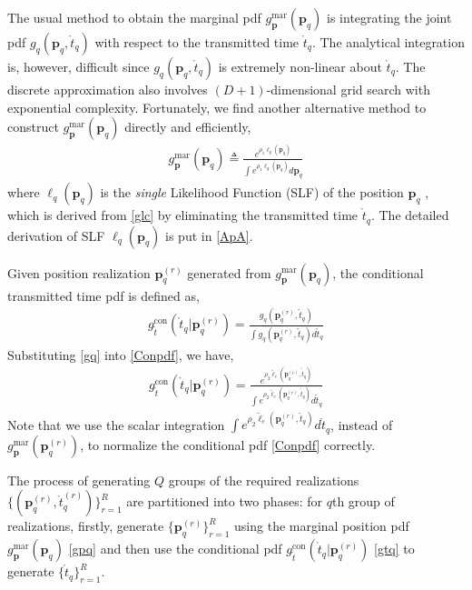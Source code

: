 \documentclass[review]{elsarticle}
\begin{document}
The usual method to obtain the marginal pdf $g_{\boldsymbol{p}}^{\text{mar}}(\boldsymbol{p}_q)$ is integrating the joint pdf $g_q(\boldsymbol{p}_q,\mathring{t}_q)$ with respect to the transmitted time $\mathring{t}_q$. The analytical integration is, however, difficult since $g_q(\boldsymbol{p}_q,\mathring{t}_q)$ is extremely non-linear about $\mathring{t}_q$. The discrete approximation also involves $(D+1)$-dimensional grid search with exponential complexity. Fortunately, we find another alternative method to construct $ g_{\boldsymbol{p}}^{\text{mar}}(\boldsymbol{p}_q)$ directly and efficiently,
\begin{align}\label{gmar}
    g_{\boldsymbol{p}}^{\text{mar}}(\boldsymbol{p}_q)\triangleq\frac{e^{\rho_1\ell_q(\boldsymbol{p}_q)}}{\int e^{\rho_1\ell_q(\boldsymbol{p}_q)} d\boldsymbol{p}_q}
\end{align} 
where $\ell_q(\boldsymbol{p}_q)$ is the \emph{single} Likelihood Function (SLF) of the position $\boldsymbol{p}_q$ , which is derived from \eqref{glc} by eliminating the transmitted time $\mathring{t}_q$. The detailed derivation of SLF $\ell_q(\boldsymbol{p}_q)$ is put in \ref{ApA}. 

Given position realization $\boldsymbol{p}_q^{(r)}$ generated from $g_{\boldsymbol{p}}^{\text{mar}}(\boldsymbol{p}_q)$, the conditional transmitted time pdf is defined as,
\begin{align}\label{Conpdf}
    g_{\mathring{t}}^{\text{con}}(\mathring{t}_q\vert \boldsymbol{p}_q^{(r)})=\frac{g_q(\boldsymbol{p}_q^{(r)},\mathring{t}_q)}{\int g_q(\boldsymbol{p}_q^{(r)},\mathring{t}_q)d\mathring{t}_q}
\end{align}
Substituting \eqref{gq} into \eqref{Conpdf}, we have,
\begin{align}\label{gtq}
    g_{\mathring{t}}^{\text{con}}(\mathring{t}_q\vert \boldsymbol{p}_q^{(r)})=\frac{e^{\rho_2 \tilde{\ell}_c(\boldsymbol{p}^{(r)}_q,\mathring{t}_q)}}{\int e^{\rho_2 \tilde{\ell}_c(\boldsymbol{p}^{(r)}_q,\mathring{t}_q)}d\mathring{t}_q}
\end{align}
Note that we use the scalar integration $\int e^{\rho_2 \tilde{\ell}_c(\boldsymbol{p}^{(r)}_q,\mathring{t}_q)}d\mathring{t}_q$, instead of $g_{\boldsymbol{p}}^{\text{mar}}(\boldsymbol{p}_q^{(r)})$, to normalize the conditional pdf \eqref{Conpdf} correctly. 

The process of generating $Q$ groups of the required realizations $\lbrace(\boldsymbol{p}_q^{(r)},\mathring{t}_q^{(r)})\rbrace_{r=1}^{R}$ are partitioned into two phases: for $q$th group of realizations, firstly, generate $\lbrace \boldsymbol{p}_q^{(r)}\rbrace_{r=1}^R$ using the marginal position pdf $g_{\boldsymbol{p}}^{\text{mar}}(\boldsymbol{p}_q)$ \eqref{gpq} and then use the conditional pdf $g_{\mathring{t}}^{\text{con}}(\mathring{t}_q\vert \boldsymbol{p}_q^{(r)})$ \eqref{gtq} to generate $\lbrace \mathring{t}_q\rbrace_{r=1}^R$.
\end{document}

